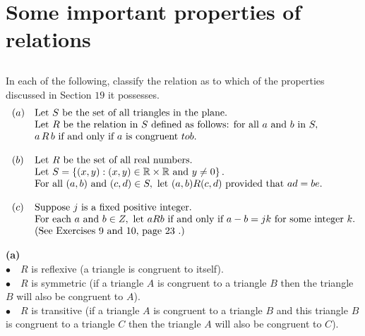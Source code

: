 \newpage

 \section{Some important properties of relations}
\subsection{}
\begin{tcolorbox}
 In each of the following, classify the relation as to which of the properties discussed in Section $19$ it possesses.
  \begin{align*}
 \begin{array}{ll} 
(a)& \text{Let } S \text{ be the set of all triangles in the plane.} \\
& \text{Let } R \text{ be the relation in } S \text{ defined as follows: for all } a \text{ and } b \text{ in } S,\\
& a \, R \, b \text{ if and only if } a \text{ is congruent } to  b. \\\\
(b) &\text{Let } R \text{ be the set of all real numbers. }\\
&\text{Let } S = \left\{(x, y): (x, y) \in \mathbb{R}\times\mathbb{R} \text{ and }  y \neq 0\right\}.\\
&\text{For all } (a, b) \text{ and } (c, d) \in S, 
\text{ let } (a, b) R (c, d) \text{ provided that } ad = be. \\\\
(c)& \text{Suppose } j \text{ is a fixed positive integer.}\\
& \text{For each } a \text{ and } b\in Z, \text{ let } a R b \text{ if and only if } a - b = jk 
\text{ for some integer } k. \\
&\text{(See Exercises 9 and 10, page 23 .)  }
\end{array}
\end{align*} 
\end{tcolorbox}
$$ $$
\textbf{(a)}\\
$\bullet\quad R$ is reflexive (a triangle is congruent to itself).\\
$\bullet\quad R$ is symmetric (if a triangle $A$   is congruent to a triangle $B$ then the triangle $B$ will also be congruent to $A$).\\
$\bullet\quad R$ is transitive (if a triangle $A$   is congruent to a triangle $B$ and this triangle $B$ is congruent to a triangle $C$  then the triangle $A$ will also be congruent to $C$).\\\\


